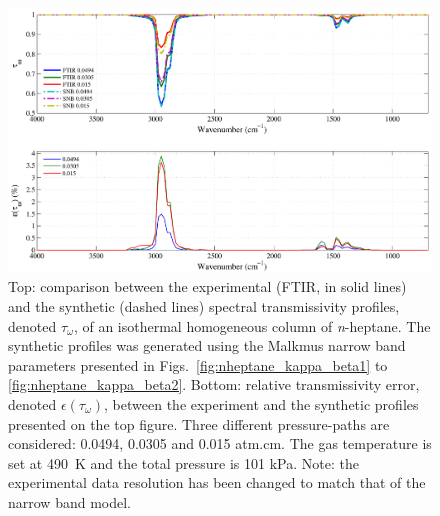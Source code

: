 \begin{figure}[p]
\includegraphics[width=\textwidth]{Figures/Comparison_Fit_Heptane_MALKMUS_Temp490K.pdf}
\caption{Top: comparison between the experimental (FTIR, in solid lines) and the synthetic (dashed lines) spectral transmissivity profiles, denoted $\tau_{\omega}$, of an isothermal homogeneous column of \textit{n}-heptane. The synthetic profiles was generated using the Malkmus narrow band parameters presented in Figs.~\ref{fig:nheptane_kappa_beta1} to \ref{fig:nheptane_kappa_beta2}. Bottom: relative transmissivity error, denoted $\epsilon{(\tau_{\omega})}$, between the experiment and the synthetic profiles presented on the top figure. Three different pressure-paths are considered: 0.0494, 0.0305 and 0.015 atm.cm. The gas temperature is set at 490~K and the total pressure is 101 kPa. Note: the experimental data resolution has been changed to match that of the narrow band model. \label{fig:nheptane_SNBVerify_490K}}
\end{figure}

